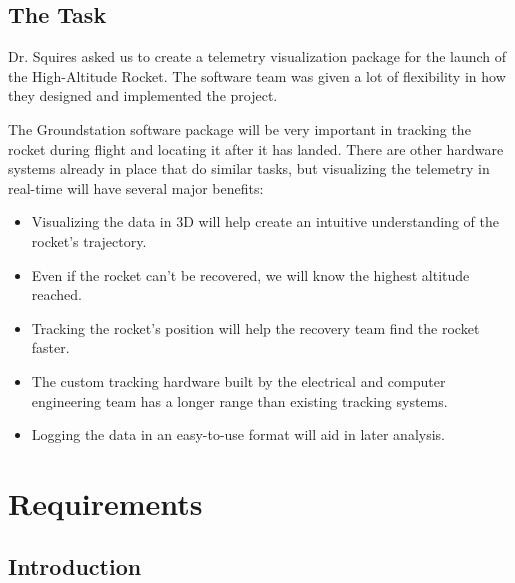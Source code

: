 \documentclass[10pt,draftclsnofoot,onecolumn]{IEEEtran}
\begin{document}
	
	\subsection{The Task}
	Dr. Squires asked us to create a telemetry visualization package for the launch
	of the High-Altitude Rocket.
	The software team was given a lot of flexibility in how they designed and implemented the project.
	
	The Groundstation software package will be very important in tracking the rocket during flight and locating
	it after it has landed.
	There are other hardware systems already in place that do similar tasks, but visualizing
	the telemetry in real-time will have several major benefits:
	
	\begin{itemize}
		\item Visualizing the data in 3D will help create an intuitive understanding of the rocket's trajectory.
		\item Even if the rocket can't be recovered, we will know the highest altitude reached.
		\item Tracking the rocket's position will help the recovery team find the rocket faster.
		\item The custom tracking hardware built by the electrical and computer engineering team has a longer range than existing tracking systems.
		\item Logging the data in an easy-to-use format will aid in later analysis.
	\end{itemize}



	
	
	
	
	
	
	
	
	
	
	
	
	
	
	
	
	
	
	
	
	


\newpage
\section{Requirements}




	\subsection{Introduction}
\end{document}
